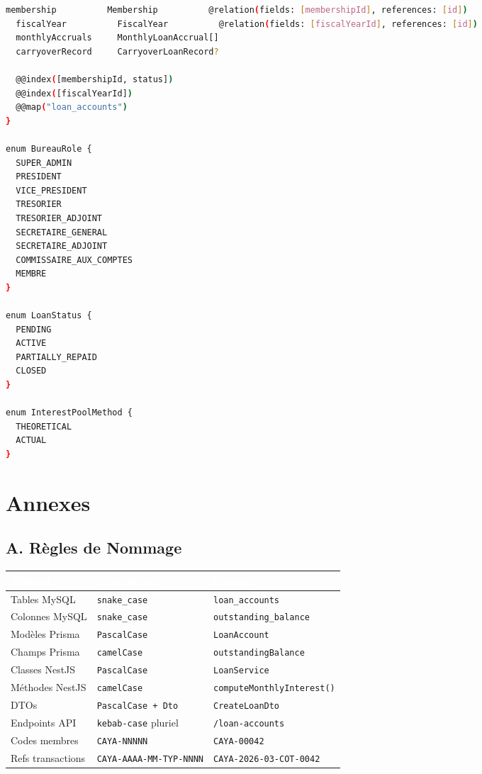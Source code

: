 \documentclass[12pt, a4paper]{report}
\begin{document}
\begin{lstlisting}[language=bash, caption={schema.prisma — extrait}]
  membership          Membership          @relation(fields: [membershipId], references: [id])
  fiscalYear          FiscalYear          @relation(fields: [fiscalYearId], references: [id])
  monthlyAccruals     MonthlyLoanAccrual[]
  carryoverRecord     CarryoverLoanRecord?

  @@index([membershipId, status])
  @@index([fiscalYearId])
  @@map("loan_accounts")
}

enum BureauRole {
  SUPER_ADMIN
  PRESIDENT
  VICE_PRESIDENT
  TRESORIER
  TRESORIER_ADJOINT
  SECRETAIRE_GENERAL
  SECRETAIRE_ADJOINT
  COMMISSAIRE_AUX_COMPTES
  MEMBRE
}

enum LoanStatus {
  PENDING
  ACTIVE
  PARTIALLY_REPAID
  CLOSED
}

enum InterestPoolMethod {
  THEORETICAL
  ACTUAL
}
\end{lstlisting}

\chapter*{Annexes}

\section*{A. Règles de Nommage}

\begin{center}
\begin{tabular}{L{3.5cm}L{4cm}L{6cm}}
  \toprule
  \textcolor{white}{\textbf{Élément}} &
  \textcolor{white}{\textbf{Convention}} &
  \textcolor{white}{\textbf{Exemple}} \\
  \midrule
  Tables MySQL      & \texttt{snake\_case}         & \texttt{loan\_accounts} \\
  Colonnes MySQL    & \texttt{snake\_case}          & \texttt{outstanding\_balance} \\
  Modèles Prisma    & \texttt{PascalCase}           & \texttt{LoanAccount} \\
  Champs Prisma     & \texttt{camelCase}            & \texttt{outstandingBalance} \\
  Classes NestJS    & \texttt{PascalCase}           & \texttt{LoanService} \\
  Méthodes NestJS   & \texttt{camelCase}            & \texttt{computeMonthlyInterest()} \\
  DTOs              & \texttt{PascalCase + Dto}     & \texttt{CreateLoanDto} \\
  Endpoints API     & \texttt{kebab-case} pluriel   & \texttt{/loan-accounts} \\
  Codes membres     & \texttt{CAYA-NNNNN}           & \texttt{CAYA-00042} \\
  Refs transactions & \texttt{CAYA-AAAA-MM-TYP-NNNN}& \texttt{CAYA-2026-03-COT-0042} \\
  \bottomrule
\end{tabular}
\end{center}
\end{document}

